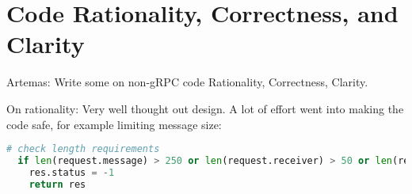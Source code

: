 \documentclass[9pt,twocolumn,twoside]{osajnl}
\begin{document}








\section{Code Rationality, Correctness, and Clarity}
\label{sec:examples}
Artemas: Write some on non-gRPC code Rationality, Correctness, Clarity.

\bigskip

\noindent 

On rationality: Very well thought out design. A lot of effort went into making the code safe, for example limiting message size: 

\begin{lstlisting}[language=python,caption={code safety code sample}]
  # check length requirements
  if len(request.message) > 250 or len(request.receiver) > 50 or len(request.sender) > 50:
    res.status = -1
    return res
\end{lstlisting}
\end{document}
